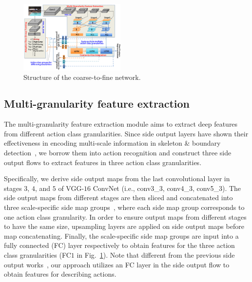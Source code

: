 \documentclass[letterpaper]{article} %
\begin{document}
\begin{figure}
  \centering
  \includegraphics[width=0.47\textwidth,height=0.32\textwidth]{./figures1/coarse-to-fine.png}
  \caption{Structure of the coarse-to-fine network.}
    \label{fig:coarse-to-fine}
\end{figure}


\subsection{Multi-granularity feature extraction}


The multi-granularity feature extraction module aims to extract deep features from different action class granularities. Since side output layers have shown their effectiveness in encoding multi-scale information in skeleton \& boundary detection~\cite{skeleton,skeleton2}, we borrow them into action recognition and construct three side output flows to extract features in three action class granularities.

Specifically, we derive side output maps from the last convolutional layer in stages $3$, $4$, and $5$ of VGG-$16$ ConvNet (i.e., conv3\_3, conv4\_3, conv5\_3). The side output maps from different stages are then sliced and concatenated into three scale-specific side map groups~\cite{skeleton}, where each side map group corresponds to one action class granularity. In order to ensure output maps from different stages to have the same size, upsampling layers are applied on side output maps before map concatenating. Finally, the scale-specific side map groups are input into a fully connected (FC) layer respectively to obtain features for the three action class granularities (FC$1$ in  Fig.~\ref{fig:coarse-to-fine}). Note that different from the previous side output works~\cite{skeleton,skeleton2}, our approach utilizes an FC layer in the side output flow  to obtain features for describing actions.
\end{document}
